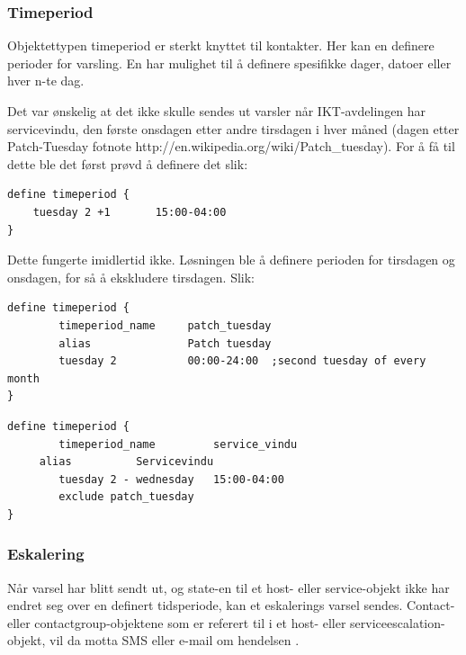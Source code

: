 \subsubsection{Timeperiod}

Objektettypen timeperiod er sterkt knyttet til kontakter. Her kan en definere perioder for varsling. En har mulighet til å definere spesifikke dager, datoer eller hver n-te dag. 

Det var ønskelig at det ikke skulle sendes ut varsler når IKT-avdelingen har servicevindu, den første onsdagen etter andre tirsdagen i hver måned (dagen etter Patch-Tuesday fotnote http://en.wikipedia.org/wiki/Patch\_tuesday). For å få til dette ble det først prøvd å definere det slik:

\begin{lstlisting}
define timeperiod {
	tuesday 2 +1       15:00-04:00
}
\end{lstlisting}

Dette fungerte imidlertid ikke. Løsningen ble å definere perioden for tirsdagen og onsdagen, for så å ekskludere tirsdagen. Slik:
\begin{lstlisting}
define timeperiod {
        timeperiod_name 	patch_tuesday
        alias           	Patch tuesday
        tuesday 2          	00:00-24:00  ;second tuesday of every month
}
\end{lstlisting}

\begin{lstlisting}
define timeperiod {
        timeperiod_name         service_vindu
	 alias			Servicevindu
        tuesday 2 - wednesday   15:00-04:00
        exclude patch_tuesday
}
\end{lstlisting}

\subsubsection{Eskalering}

Når varsel har blitt sendt ut, og state-en til et host- eller service-objekt ikke har endret seg over en definert tidsperiode, kan et eskalerings varsel sendes. Contact- eller contactgroup-objektene som er referert til i et host- eller serviceescalation-objekt, vil da motta SMS eller e-mail om hendelsen .

